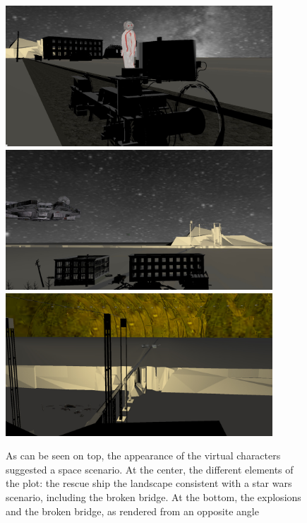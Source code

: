 \documentclass[
		twoside,openright,titlepage,numbers=noenddot,manychapters,
		headinclude,%
                footinclude=false,cleardoublepage=empty,
                BCOR=5mm,
		fontsize=11pt, %
                 enabledeprecatedfontcommands]{scrreprt}
\begin{document}
\begin{figure}[!ht]
\begin{center}
\includegraphics[width=10cm]{figures/story_in_vr_pics/export_image1.jpg}
\\[1ex]
\includegraphics[width=10cm]{figures/story_in_vr_pics/export_image2.jpg}
\\[1ex]
\includegraphics[width=10cm]{figures/story_in_vr_pics/export_image3.jpg}
\caption{As can be seen on top, the appearance of the virtual characters suggested a space scenario. At the center, the different elements of the plot: the rescue ship the landscape consistent with a star wars scenario, including the broken bridge. At the bottom, the explosions and the broken bridge, as rendered from an opposite angle}
\label{fig_story}
\end{center}

\end{figure} 
\end{document}
